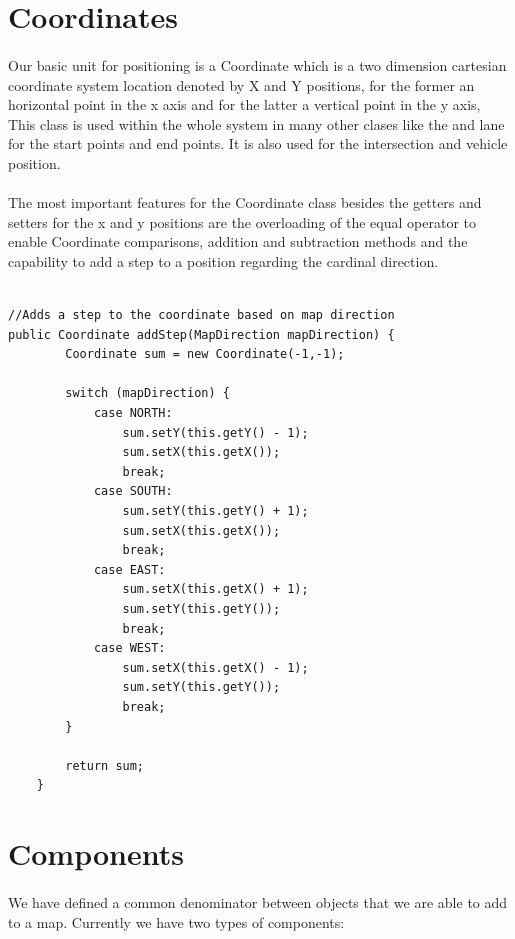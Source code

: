 \documentclass[a4paper]{article}
\begin{document}
\section{Coordinates}

\paragraph{}
Our basic unit for positioning is a Coordinate which is a two dimension cartesian coordinate system location denoted by X and Y positions, for the former an horizontal point in the x axis and for the latter a vertical point in the y axis, This class is used within the whole system in many other clases like the and lane for the start points and end points. It is also used for the intersection and vehicle position.

\paragraph{}
The most important features for the Coordinate class besides the getters and setters for the x and y positions are the overloading of the equal operator to enable Coordinate comparisons, addition and subtraction methods and the capability to add a step to a position regarding the cardinal direction.

\begin{lstlisting}

//Adds a step to the coordinate based on map direction
public Coordinate addStep(MapDirection mapDirection) {
        Coordinate sum = new Coordinate(-1,-1);

        switch (mapDirection) {
            case NORTH:
                sum.setY(this.getY() - 1);
                sum.setX(this.getX());
                break;
            case SOUTH:
                sum.setY(this.getY() + 1);
                sum.setX(this.getX());
                break;
            case EAST:
                sum.setX(this.getX() + 1);
                sum.setY(this.getY());
                break;
            case WEST:
                sum.setX(this.getX() - 1);
                sum.setY(this.getY());
                break;
        }

        return sum;
    }
\end{lstlisting}

\section{Components}
\paragraph{}
We have defined a common denominator between objects that we are able to add to a map.
Currently we have two types of components:
\end{document}

